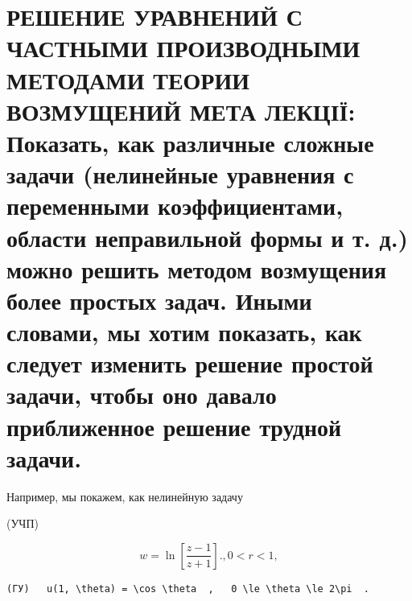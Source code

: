 \documentclass[
  ukrainian,
]{article}
\begin{document}
\section{РЕШЕНИЕ УРАВНЕНИЙ С ЧАСТНЫМИ ПРОИЗВОДНЫМИ МЕТОДАМИ ТЕОРИИ
ВОЗМУЩЕНИЙ МЕТА ЛЕКЦІЇ: Показать, как различные сложные задачи
(нелинейные уравнения с переменными коэффициентами, области неправильной
формы и т. д.) можно решить методом возмущения более простых задач.
Иными словами, мы хотим показать, как следует изменить решение простой
задачи, чтобы оно давало приближенное решение трудной
задачи.}\label{ux440ux435ux448ux435ux43dux438ux435-ux443ux440ux430ux432ux43dux435ux43dux438ux439-ux441-ux447ux430ux441ux442ux43dux44bux43cux438-ux43fux440ux43eux438ux437ux432ux43eux434ux43dux44bux43cux438-ux43cux435ux442ux43eux434ux430ux43cux438-ux442ux435ux43eux440ux438ux438-ux432ux43eux437ux43cux443ux449ux435ux43dux438ux439-ux43cux435ux442ux430-ux43bux435ux43aux446ux456ux457-ux43fux43eux43aux430ux437ux430ux442ux44c-ux43aux430ux43a-ux440ux430ux437ux43bux438ux447ux43dux44bux435-ux441ux43bux43eux436ux43dux44bux435-ux437ux430ux434ux430ux447ux438-ux43dux435ux43bux438ux43dux435ux439ux43dux44bux435-ux443ux440ux430ux432ux43dux435ux43dux438ux44f-ux441-ux43fux435ux440ux435ux43cux435ux43dux43dux44bux43cux438-ux43aux43eux44dux444ux444ux438ux446ux438ux435ux43dux442ux430ux43cux438-ux43eux431ux43bux430ux441ux442ux438-ux43dux435ux43fux440ux430ux432ux438ux43bux44cux43dux43eux439-ux444ux43eux440ux43cux44b-ux438-ux442.-ux434.-ux43cux43eux436ux43dux43e-ux440ux435ux448ux438ux442ux44c-ux43cux435ux442ux43eux434ux43eux43c-ux432ux43eux437ux43cux443ux449ux435ux43dux438ux44f-ux431ux43eux43bux435ux435-ux43fux440ux43eux441ux442ux44bux445-ux437ux430ux434ux430ux447.-ux438ux43dux44bux43cux438-ux441ux43bux43eux432ux430ux43cux438-ux43cux44b-ux445ux43eux442ux438ux43c-ux43fux43eux43aux430ux437ux430ux442ux44c-ux43aux430ux43a-ux441ux43bux435ux434ux443ux435ux442-ux438ux437ux43cux435ux43dux438ux442ux44c-ux440ux435ux448ux435ux43dux438ux435-ux43fux440ux43eux441ux442ux43eux439-ux437ux430ux434ux430ux447ux438-ux447ux442ux43eux431ux44b-ux43eux43dux43e-ux434ux430ux432ux430ux43bux43e-ux43fux440ux438ux431ux43bux438ux436ux435ux43dux43dux43eux435-ux440ux435ux448ux435ux43dux438ux435-ux442ux440ux443ux434ux43dux43eux439-ux437ux430ux434ux430ux447ux438.}

Например, мы покажем, как нелинейную задачу

(УЧП)

\[
w = \ln \left[ \frac{z-1}{z+1} \right].
,   0 < r < 1  ,
\]

\begin{verbatim}
(ГУ)   u(1, \theta) = \cos \theta  ,   0 \le \theta \le 2\pi  .
\end{verbatim}
\end{document}
